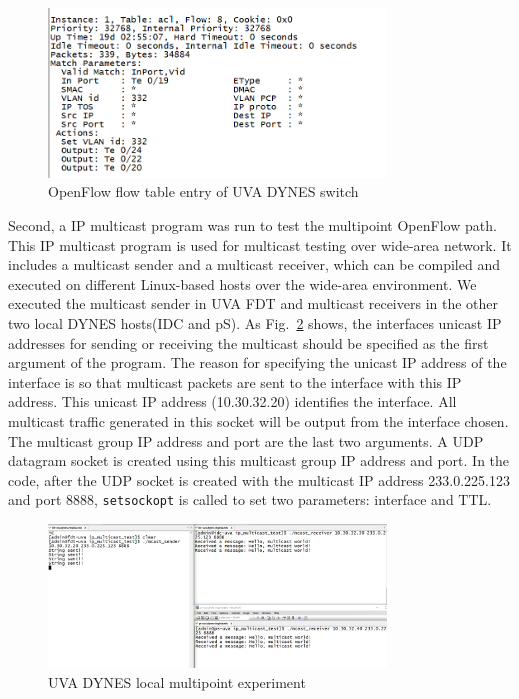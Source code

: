 \begin{figure}[htb!]
\centering
\includegraphics[width=0.8\textwidth]{figures/flow-table.png}
\caption{OpenFlow flow table entry of UVA DYNES switch}
\label{fig:flowtable}
\end{figure}

Second, a IP multicast program was run to test the multipoint OpenFlow path. This IP multicast program is used for multicast testing
over wide-area network. It includes a multicast sender and a multicast receiver,
which can be compiled and executed on different Linux-based hosts over the wide-area environment.
We executed the multicast sender in UVA FDT and multicast receivers in the other two local DYNES hosts(IDC and pS).
As Fig.~\ref{fig:localmulticast} shows, the interfaces unicast IP addresses for sending or receiving the multicast should be specified as the first argument of the program. The reason for specifying the unicast IP address of the interface is so that multicast packets are sent to the interface with this IP address. This unicast IP address (10.30.32.20) identifies the interface. All multicast traffic generated in this socket will be output from the interface chosen. The multicast group IP address and port are the last two arguments. A UDP datagram socket is created using this multicast group IP address and port. In the code, after the UDP socket is created with the multicast IP address 233.0.225.123 and port 8888, \texttt{setsockopt} is called to set two parameters: interface and TTL.

\begin{figure}[htb!]
\centering
\includegraphics[width=0.8\textwidth]{figures/local-multicast.png}
\caption{UVA DYNES local multipoint experiment}
\label{fig:localmulticast}
\end{figure}

